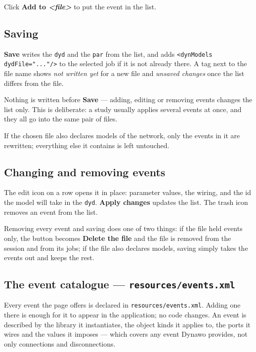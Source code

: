 \documentclass[a4paper,11pt]{article}
\newcommand{\code}[1]{\texttt{\small #1}}
\newcommand{\ftype}[1]{\texttt{\small\color{rteblu}#1}}
\begin{document}
Click \textbf{Add to \emph{<file>}} to put the event in the list.

\subsection{Saving}

\textbf{Save} writes the \ftype{dyd} and the \ftype{par} from the list, and
adds \code{<dynModels dydFile="..."/>} to the selected job if it is not already
there. A tag next to the file name shows \emph{not written yet} for a new file
and \emph{unsaved changes} once the list differs from the file.

\begin{notebox}
Nothing is written before \textbf{Save} --- adding, editing or removing events
changes the list only. This is deliberate: a study usually applies several
events at once, and they all go into the same pair of files.
\end{notebox}

If the chosen file also declares models of the network, only the events in it
are rewritten; everything else it contains is left untouched.

\subsection{Changing and removing events}

The edit icon on a row opens it in place: parameter values, the wiring, and the
id the model will take in the \ftype{dyd}. \textbf{Apply changes} updates the
list. The trash icon removes an event from the list.

Removing every event and saving does one of two things: if the file held events
only, the button becomes \textbf{Delete the file} and the file is removed from
the session and from its jobs; if the file also declares models, saving simply
takes the events out and keeps the rest.

\subsection{The event catalogue --- \code{resources/events.xml}}
\label{sec:eventscatalogue}

Every event the page offers is declared in \code{resources/events.xml}. Adding
one there is enough for it to appear in the application; no code changes. An
event is described by the library it instantiates, the object kinds it applies
to, the ports it wires and the values it imposes --- which covers any event
Dynawo provides, not only connections and disconnections.
\end{document}

